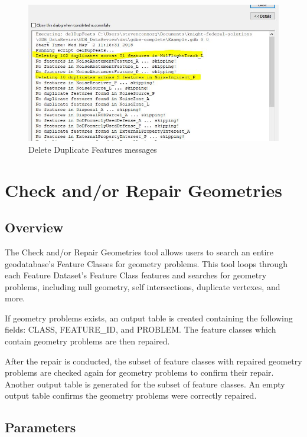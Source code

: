 \documentclass[openany]{book}
\theoremstyle{definition}
\theoremstyle{definition}
\theoremstyle{definition}
\theoremstyle{remark}
\begin{document}
\begin{figure}[H]

{\centering \includegraphics{figures/delF-messages} 

}

\caption{Delete Duplicate Features messages}\label{fig:delFmessages}
\end{figure}

\hypertarget{chkGeom}{\chapter{Check and/or Repair
Geometries}\label{chkGeom}}

\section{Overview}\label{overview-5}

The Check and/or Repair Geometries tool allows users to search an entire
geodatabase's Feature Classes for geometry problems. This tool loops
through each Feature Dataset's Feature Class features and searches for
geometry problems, including null geometry, self intersections,
duplicate vertexes, and more.

If geometry problems exists, an output table is created containing the
following fields: CLASS, FEATURE\_ID, and PROBLEM. The feature classes
which contain geometry problems are then repaired.

After the repair is conducted, the subset of feature classes with
repaired geometry problems are checked again for geometry problems to
confirm their repair. Another output table is generated for the subset
of feature classes. An empty output table confirms the geometry problems
were correctly repaired.

\section{Parameters}\label{parameters-5}
\end{document}
